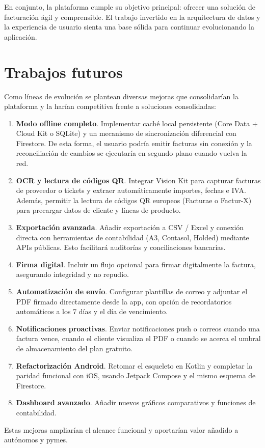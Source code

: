 \begin{large}
En conjunto, la plataforma cumple su objetivo principal: ofrecer una solución de facturación ágil y comprensible. El trabajo invertido en la arquitectura de datos y la experiencia de usuario sienta una base sólida para continuar evolucionando la aplicación.

\end{large}

\break

\section{Trabajos futuros}

\begin{large}

Como líneas de evolución se plantean diversas mejoras que consolidarían la plataforma y la harían competitiva frente a soluciones consolidadas:
\begin{enumerate}
  \item \textbf{Modo offline completo}.  Implementar caché local persistente (Core Data + Cloud Kit o SQLite) y un mecanismo de sincronización diferencial con Firestore. De esta forma, el usuario podría emitir facturas sin conexión y la reconciliación de cambios se ejecutaría en segundo plano cuando vuelva la red.
  \item \textbf{OCR y lectura de códigos QR}.  Integrar Vision Kit para capturar facturas de proveedor o tickets y extraer automáticamente importes, fechas e IVA. Además, permitir la lectura de códigos QR europeos (Facturae o Factur-X) para precargar datos de cliente y líneas de producto.
  \item \textbf{Exportación avanzada}.  Añadir exportación a CSV / Excel y conexión directa con herramientas de contabilidad (A3, Contasol, Holded) mediante APIs públicas. Esto facilitará auditorías y conciliaciones bancarias.
  \item \textbf{Firma digital}.  Incluir un flujo opcional para firmar digitalmente la factura, asegurando integridad y no repudio.
  \item \textbf{Automatización de envío}.  Configurar plantillas de correo y adjuntar el PDF firmado directamente desde la app, con opción de recordatorios automáticos a los 7 días y el día de vencimiento.
  \item \textbf{Notificaciones proactivas}.  Enviar notificaciones push o correos cuando una factura vence, cuando el cliente visualiza el PDF o cuando se acerca el umbral de almacenamiento del plan gratuito.
  \item \textbf{Refactorización Android}.  Retomar el esqueleto en Kotlin y completar la paridad funcional con iOS, usando Jetpack Compose y el mismo esquema de Firestore.
  \item \textbf{Dashboard avanzado}.  Añadir nuevos gráficos comparativos y funciones de contabilidad.
\end{enumerate}

Estas mejoras ampliarían el alcance funcional y aportarían valor añadido a autónomos y pymes.

\end{large}
